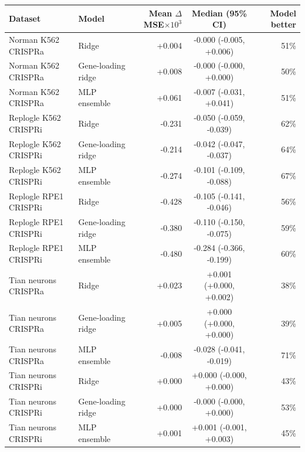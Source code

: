 \begin{tabular}{llrcr}
\toprule
Dataset & Model & Mean $\Delta$MSE$\times10^3$ & Median (95\% CI) & Model better \\
\midrule
Norman K562 CRISPRa & Ridge & +0.004 & -0.000 (-0.005, +0.006) & 51\% \\
Norman K562 CRISPRa & Gene-loading ridge & +0.008 & -0.000 (-0.000, +0.000) & 50\% \\
Norman K562 CRISPRa & MLP ensemble & +0.061 & -0.007 (-0.031, +0.041) & 51\% \\
Replogle K562 CRISPRi & Ridge & -0.231 & -0.050 (-0.059, -0.039) & 62\% \\
Replogle K562 CRISPRi & Gene-loading ridge & -0.214 & -0.042 (-0.047, -0.037) & 64\% \\
Replogle K562 CRISPRi & MLP ensemble & -0.274 & -0.101 (-0.109, -0.088) & 67\% \\
Replogle RPE1 CRISPRi & Ridge & -0.428 & -0.105 (-0.141, -0.046) & 56\% \\
Replogle RPE1 CRISPRi & Gene-loading ridge & -0.380 & -0.110 (-0.150, -0.075) & 59\% \\
Replogle RPE1 CRISPRi & MLP ensemble & -0.480 & -0.284 (-0.366, -0.199) & 60\% \\
Tian neurons CRISPRa & Ridge & +0.023 & +0.001 (+0.000, +0.002) & 38\% \\
Tian neurons CRISPRa & Gene-loading ridge & +0.005 & +0.000 (+0.000, +0.000) & 39\% \\
Tian neurons CRISPRa & MLP ensemble & -0.008 & -0.028 (-0.041, -0.019) & 71\% \\
Tian neurons CRISPRi & Ridge & +0.000 & +0.000 (-0.000, +0.000) & 43\% \\
Tian neurons CRISPRi & Gene-loading ridge & +0.000 & -0.000 (-0.000, +0.000) & 53\% \\
Tian neurons CRISPRi & MLP ensemble & +0.001 & +0.001 (-0.001, +0.003) & 45\% \\
\bottomrule
\end{tabular}